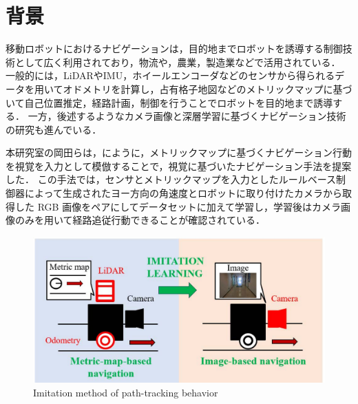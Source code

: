 
\section{背景}
移動ロボットにおけるナビゲーションは，目的地までロボットを誘導する制御技術として広く利用されており，物流や，農業，製造業などで活用されている．
一般的には，LiDARやIMU，ホイールエンコーダなどのセンサから得られるデータを用いてオドメトリを計算し，占有格子地図などのメトリックマップに基づいて自己位置推定，経路計画，制御を行うことでロボットを目的地まで誘導する．
一方，後述するようなカメラ画像と深層学習に基づくナビゲーション技術の研究も進んでいる．

本研究室の岡田らは，にように，メトリックマップに基づくナビゲーション行動を視覚を入力として模倣することで，視覚に基づいたナビゲーション手法\cite{okada2020}\cite{okada2021}を提案した．
この手法では，センサとメトリックマップを入力としたルールベース制御器によって生成されたヨー方向の角速度とロボットに取り付けたカメラから取得した RGB 画像をペアにしてデータセットに加えて学習し，学習後はカメラ画像のみを用いて経路追従行動できることが確認されている．
\begin{figure}[htbp]
     \centering
     \includegraphics[width=130mm]{images/pdf/ishiguro/system.pdf}
     \caption{Imitation method of path-tracking behavior}
     \label{fig:imitation_sys}
\end{figure}

